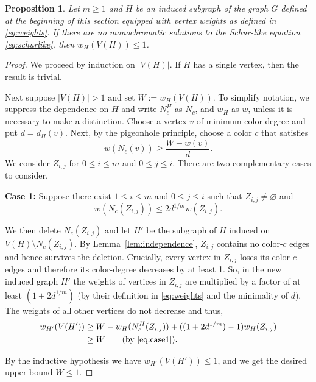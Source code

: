 \documentclass[10pt,a4paper]{amsart}
\newtheorem{proposition}[theorem]{Proposition}
\begin{document}
\begin{proposition} \label{prop:weight_le1}
Let $m\geq 1$ and \(H\) be an induced subgraph of the graph $G$ defined at the beginning of this section equipped with vertex weights as defined in \eqref{eq:weights}. If there are no monochromatic solutions to the Schur-like equation \eqref{eq:schurlike}, then \(w_{H}(V(H))\leq 1\).
\end{proposition} 

\begin{proof} 
We proceed by induction on \(|V(H)|\). If \(H\) has a single vertex, then the result is trivial.

Next suppose \(|V(H)|>1\) and set \(W:=w_{H}(V(H))\). To simplify notation, we suppress the dependence on $H$ and write $N_c^{H}$ as $N_c$, and $w_H$ as $w$, unless it is necessary to make a distinction. Choose a vertex \(v\) of minimum color-degree and put \(d=d_{H}(v)\). Next, by the pigeonhole principle, choose a color \(c\) that satisfies
\[
 w(N_{c}(v)) \geq \frac{W-w(v)}{d}.
 \] 
 We consider \(Z_{i,j}\) for \(0\leq i\leq m\) and \(0\leq j \leq i\). There are two complementary cases to consider.

\textbf{Case 1:} Suppose there exist \(1\leq i \leq m\) and \(0\leq j\leq i\) such that \(Z_{i,j}\neq\varnothing\) and 
\begin{equation} \label{eq:case1}
     w(N_{c}(Z_{i,j})) \leq 2 d^{1/m}w(Z_{i,j}). 
\end{equation}

We then delete \(N_{c}(Z_{i,j})\) and let \(H'\) be the subgraph of
\(H\) induced on \(V(H)\setminus N_{c}(Z_{i,j})\). By Lemma~\ref{lem:independence}, \(Z_{i,j}\) contains no color-\(c\) edges and hence survives the deletion. Crucially, every vertex in \(Z_{i,j}\) loses its color-\(c\) edges and therefore its color-degree decreases by at least 1. So, in the new induced graph $H'$ the weights of vertices in \(Z_{i,j}\) are multiplied by a factor of at least \((1+ 2 d^{1/m})\) (by their definition in \eqref{eq:weights} and the minimality of \(d\)). The weights of all other vertices do not decrease and thus,
 \begin{align*}
 w_{H'}(V(H'))  & \geq W - w_{H}(N_{c}^{H}(Z_{i,j}))+ ((1+ 2 d^{1/m})-1)w_{H}(Z_{i,j}) \\
  & \geq W  \qquad (\text{by \eqref{eq:case1}}).
 \end{align*} 

By the inductive hypothesis we have $w_{H'}(V(H')) \le 1$, and we get the desired upper bound \(W\leq 1\).


\end{proof}
\end{document}
